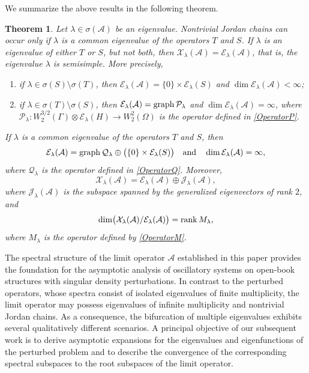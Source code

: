 \documentclass[reqno]{amsart}
\newtheorem{thm}{Theorem}
\theoremstyle{definition}
\theoremstyle{remark}
\numberwithin{equation}{section}
\newcommand{\rank}{\mathop{\rm rank}}
\newcommand{\graph}{\mathop{\rm graph}}
\newcommand{\cA}{\mathcal{A}}
\newcommand{\cE}{\mathcal{E}}
\newcommand{\cJ}{\mathcal{J}}
\newcommand{\cP}{\mathcal{P}}
\newcommand{\cQ}{\mathcal{Q}}
\newcommand{\cX}{\mathcal{X}}
\begin{document}
We summarize the above results in the following theorem.

\begin{thm}\label{MainThm}
Let $\lambda\in\sigma(\cA)$ be an eigenvalue. Nontrivial Jordan chains can occur only if $\lambda$ is a common eigenvalue of the operators $T$ and $S$. If $\lambda$ is an eigenvalue of either $T$ or $S$, but not both, then $\cX_\lambda(\cA)=\cE_\lambda(\cA)$, that is, the eigenvalue $\lambda$ is semisimple.
More precisely,
\begin{enumerate}
\item if $\lambda\in\sigma(S)\setminus\sigma(T)$, then $\cE_\lambda(\cA)=\{0\}\times\cE_\lambda(S)$ and $\dim\cE_\lambda(\cA)<\infty$;
\item if $\lambda\in\sigma(T)\setminus\sigma(S)$, then $\cE_\lambda(\cA)=\graph\cP_\lambda$ and $\dim\cE_\lambda(\cA)=\infty$,
where $\cP_\lambda\colon W_2^{3/2}(\Gamma)\otimes\cE_\lambda(H)\to W_2^2(\Omega)$ is the operator defined in \eqref{OperatorP}. 
\end{enumerate}

If $\lambda$ is a common eigenvalue of the operators $T$ and $S$, then
\begin{equation*}
\cE_\lambda(\cA)=\graph\cQ_\lambda\oplus\bigl(\{0\}\times\cE_\lambda(S)\bigr)\quad\text{and}\quad\dim\cE_\lambda(\cA)=\infty,
\end{equation*}
where $\cQ_\lambda$ is the operator defined in \eqref{OperatorQ}. Moreover,
\begin{equation*}
\cX_\lambda(\cA)=\cE_\lambda(\cA)\oplus\cJ_\lambda(\cA),
\end{equation*}
where $\cJ_\lambda(\cA)$ is the subspace spanned by the generalized eigenvectors of rank $2$, and 
\begin{equation*}
\dim\bigl(\cX_\lambda(\cA)/\cE_\lambda(\cA)\bigr)=\rank M_\lambda,
\end{equation*}
where $M_\lambda$ is the operator defined by \eqref{OperatorM}. 
\end{thm}


The spectral structure of the limit operator $\cA$ established in this paper provides the foundation for the asymptotic analysis of oscillatory systems on open-book structures with singular density perturbations. In contrast to the perturbed operators, whose spectra consist of isolated eigenvalues of finite multiplicity, the limit operator may possess eigenvalues of infinite multiplicity and nontrivial Jordan chains. As a consequence, the bifurcation of multiple eigenvalues exhibits several qualitatively different scenarios. A principal objective of our subsequent work is to derive asymptotic expansions for the eigenvalues and eigenfunctions of the perturbed problem and to describe the convergence of the corresponding spectral subspaces to the root subspaces of the limit operator.
\end{document}
